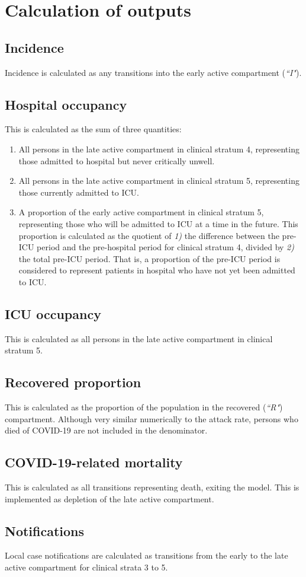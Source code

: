 \section{Calculation of outputs}

\subsection{Incidence}
Incidence is calculated as any transitions into the early active compartment (\textit{``I"}).

\subsection{Hospital occupancy}
This is calculated as the sum of three quantities:
\begin{enumerate}
    \item All persons in the late active compartment in clinical stratum 4, representing those admitted to hospital but never critically unwell.
    \item All persons in the late active compartment in clinical stratum 5, representing those currently admitted to ICU.
    \item A proportion of the early active compartment in clinical stratum 5, representing those who will be admitted to ICU at a time in the future. This proportion is calculated as the quotient of \textit{1)} the difference between the pre-ICU period and the pre-hospital period for clinical stratum 4, divided by \textit{2)} the total pre-ICU period. That is, a proportion of the pre-ICU period is considered to represent patients in hospital who have not yet been admitted to ICU.
\end{enumerate}

\subsection{ICU occupancy}
This is calculated as all persons in the late active compartment in clinical stratum 5.

\subsection{Recovered proportion}
This is calculated as the proportion of the population in the recovered (\textit{``R"}) compartment. Although very similar numerically to the attack rate, persons who died of COVID-19 are not included in the denominator.

\subsection{COVID-19-related mortality}
This is calculated as all transitions representing death, exiting the model. This is implemented as depletion of the late active compartment.

\subsection{Notifications}
Local case notifications are calculated as transitions from the early to the late active compartment for clinical strata 3 to 5.
